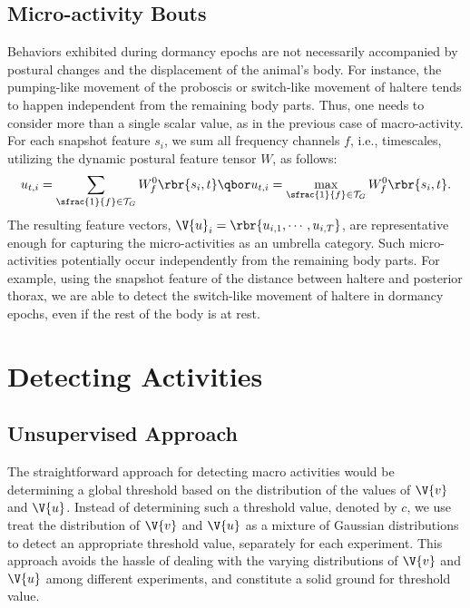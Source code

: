 \subsection{Micro-activity Bouts}\label{section:micro-activities}
Behaviors exhibited during dormancy epochs are not necessarily accompanied by postural changes and the displacement of the animal's body.
For instance, the pumping-like movement of the proboscis or switch-like movement of haltere tends to happen independent from the remaining body parts.
Thus, one needs to consider more than a single scalar value, as in the previous case of macro-activity.
For each snapshot feature $s_i$, we sum all frequency channels $f$, i.e., timescales, utilizing the dynamic postural feature tensor $W$, as follows:
\begin{equation}
	u_{t,i} = \sum_{\sfrac{1}{f} \in \mathcal{T}_G}{W_f^0\rbr{s_i,t}} \qbor
	u_{t,i} = \max_{\sfrac{1}{f} \in \mathcal{T}_G}{W_f^0\rbr{s_i,t}}.
\end{equation}
The resulting feature vectors, $\V{u}_i=\rbr{u_{i,1}, \cdots, u_{i,T}}$, are representative enough for capturing the micro-activities as an umbrella category.
Such micro-activities potentially occur independently from the remaining body parts.
For example, using the snapshot feature of the distance between haltere and posterior thorax, we are able to detect the switch-like movement of haltere in dormancy epochs, even if the rest of the body is at rest.

\section{Detecting Activities}\label{section:detecting-activities}
\subsection{Unsupervised Approach}\label{section:unsupervised-detection}
The straightforward approach for detecting macro activities would be determining a global threshold based on the distribution of the values of $\V{v}$ and $\V{u}$.
Instead of determining such a threshold value, denoted by $c$, we use treat the distribution of $\V{v}$ and $\V{u}$ as a mixture of Gaussian distributions to detect an appropriate threshold value, separately for each experiment.
This approach avoids the hassle of dealing with the varying distributions of $\V{v}$ and $\V{u}$ among different experiments, and constitute a solid ground for threshold value.

